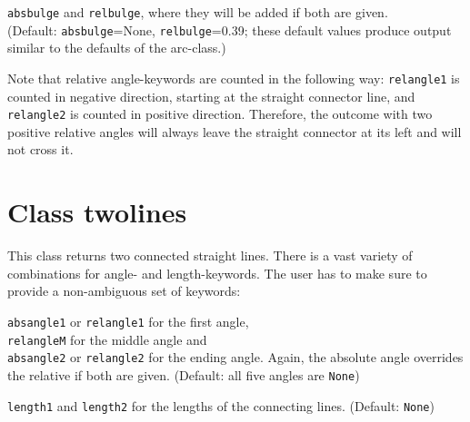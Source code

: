 \verb|absbulge| and \verb|relbulge|, where they will be added if both are
given.\\ (Default: \verb|absbulge|=None, \verb|relbulge|=0.39; these default
values produce output similar to the defaults of the arc-class.)\medskip


Note that relative angle-keywords are counted in the following way:
\verb|relangle1| is counted in negative direction, starting at the straight
connector line, and \verb|relangle2| is counted in positive direction.
Therefore, the outcome with two positive relative angles will always leave the
straight connector at its left and will not cross it.

\section{Class twolines}

This class returns two connected straight lines. There is a vast variety of
combinations for angle- and length-keywords. The user has to make sure to
provide a non-ambiguous set of keywords:\medskip

\verb|absangle1| or \verb|relangle1| for the first angle,\\
\verb|relangleM| for the middle angle and\\
\verb|absangle2| or \verb|relangle2| for the ending angle.
Again, the absolute angle overrides the relative if both are given. (Default:
all five angles are \verb|None|)\medskip

\verb|length1| and \verb|length2| for the lengths of the connecting lines.
(Default: \verb|None|)

